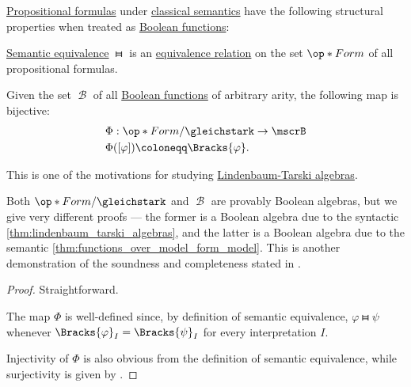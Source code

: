 \begin{proposition}\label{thm:propositional_formulas_and_boolean_functions}
  \hyperref[def:propositional_formula]{Propositional formulas} under \hyperref[def:truth_value_algebra/classical]{classical semantics} have the following structural properties when treated as \hyperref[def:boolean_function]{Boolean functions}:

  \begin{thmenum}
     \hyperref[def:semantic_equivalence]{Semantic equivalence} \( \gleichstark \) is an \hyperref[def:equivalence_relation]{equivalence relation} on the set \( \op*{Form} \) of all propositional formulas.

     Given the set \( \mscrB \) of all \hyperref[def:boolean_function]{Boolean functions} of arbitrary arity, the following map is bijective:
    \begin{equation*}
      \begin{aligned}
        &\Phi: \op*{Form} / {\gleichstark} \to \mscrB \\
        &\Phi([\varphi]) \coloneqq \Bracks{\varphi}.
      \end{aligned}
    \end{equation*}
  \end{thmenum}
\end{proposition}
\begin{comments}
  \item This is one of the motivations for studying \hyperref[def:lindenbaum_tarski_algebra]{Lindenbaum-Tarski algebras}.
  \item Both \( \op*{Form} / {\gleichstark} \) and \( \mscrB \) are provably Boolean algebras, but we give very different proofs --- the former is a Boolean algebra due to the syntactic \cref{thm:lindenbaum_tarski_algebras}, and the latter is a Boolean algebra due to the semantic \cref{thm:functions_over_model_form_model}. This is another demonstration of the soundness and completeness stated in .
\end{comments}
\begin{proof}
   Straightforward.

   The map \( \Phi \) is well-defined since, by definition of semantic equivalence, \( \varphi \gleichstark \psi \) whenever \( \Bracks{\varphi}_I = \Bracks{\psi}_I \) for every interpretation \( I \).

  Injectivity of \( \Phi \) is also obvious from the definition of semantic equivalence, while surjectivity is given by .
\end{proof}

